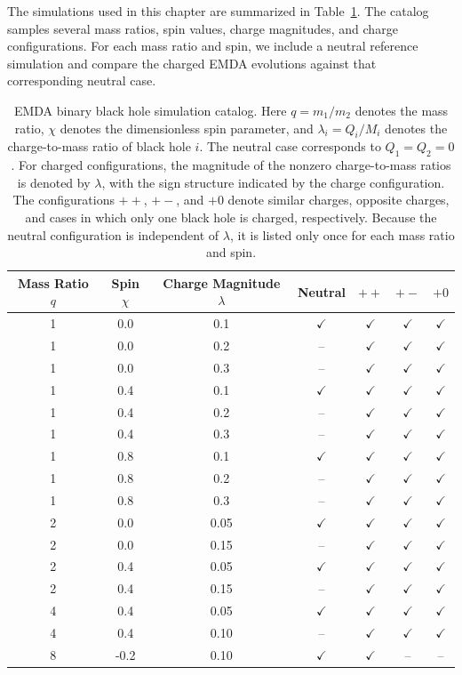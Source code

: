 The simulations used in this chapter are summarized in Table~\ref{tab:simulation_catalog}. The catalog samples several mass ratios, spin values, charge magnitudes, and charge configurations. For each mass ratio and spin, we include a neutral reference simulation and compare the charged EMDA evolutions against that corresponding neutral case.
\FloatBarrier
\begin{table}[htbp]
\centering
\caption[EMDA binary black hole simulation catalog]{EMDA binary black hole simulation catalog. Here $q=m_1/m_2$ denotes the mass ratio, $\chi$ denotes the dimensionless spin parameter, and $\lambda_i=Q_i/M_i$ denotes the charge-to-mass ratio of black hole $i$. The neutral case corresponds to $Q_1=Q_2=0$. For charged configurations, the magnitude of the nonzero charge-to-mass ratios is denoted by $\lambda$, with the sign structure indicated by the charge configuration. The configurations $++$, $+-$, and $+0$ denote similar charges, opposite charges, and cases in which only one black hole is charged, respectively. Because the neutral configuration is independent of $\lambda$, it is listed only once for each mass ratio and spin.}
\label{tab:simulation_catalog}
\begin{tabular}{ccccccc}
\toprule
Mass Ratio $q$ & Spin $\chi$ & Charge Magnitude $\lambda$ & Neutral & $++$ & $+-$ & $+0$ \\
\midrule
1 & 0.0 & 0.1 & $\checkmark$ & $\checkmark$ & $\checkmark$ & $\checkmark$ \\
1 & 0.0 & 0.2 & -- & $\checkmark$ & $\checkmark$ & $\checkmark$ \\
1 & 0.0 & 0.3 & -- & $\checkmark$ & $\checkmark$ & $\checkmark$ \\
\midrule
1 & 0.4 & 0.1 & $\checkmark$ & $\checkmark$ & $\checkmark$ & $\checkmark$ \\
1 & 0.4 & 0.2 & -- & $\checkmark$ & $\checkmark$ & $\checkmark$ \\
1 & 0.4 & 0.3 & -- & $\checkmark$ & $\checkmark$ & $\checkmark$ \\
\midrule
1 & 0.8 & 0.1 & $\checkmark$ & $\checkmark$ & $\checkmark$ & $\checkmark$ \\
1 & 0.8 & 0.2 & -- & $\checkmark$ & $\checkmark$ & $\checkmark$ \\
1 & 0.8 & 0.3 & -- & $\checkmark$ & $\checkmark$ & $\checkmark$ \\
\midrule
2 & 0.0 & 0.05 & $\checkmark$ & $\checkmark$ & $\checkmark$ & $\checkmark$ \\
2 & 0.0 & 0.15 & -- & $\checkmark$ & $\checkmark$ & $\checkmark$ \\
\midrule
2 & 0.4 & 0.05 & $\checkmark$ & $\checkmark$ & $\checkmark$ & $\checkmark$ \\
2 & 0.4 & 0.15 & -- & $\checkmark$ & $\checkmark$ & $\checkmark$ \\
\midrule
4 & 0.4 & 0.05 & $\checkmark$ & $\checkmark$ & $\checkmark$ & $\checkmark$ \\
4 & 0.4 & 0.10 & -- & $\checkmark$ & $\checkmark$ & $\checkmark$ \\
\midrule
8 & -0.2 & 0.10 & $\checkmark$ & $\checkmark$ & -- & -- \\
\bottomrule
\end{tabular}
\end{table}

